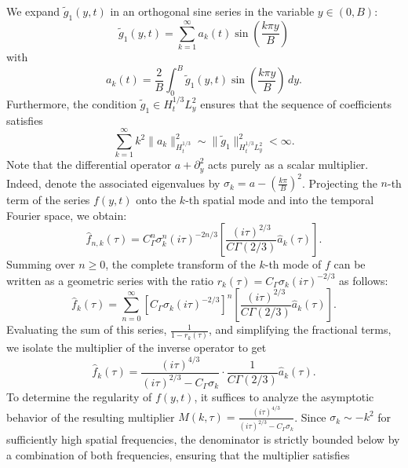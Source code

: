 \documentclass[11pt]{article}
\numberwithin{equation}{section}
\begin{document}
We expand $\tilde{g}_1(y,t)$ in an orthogonal sine series in the variable $y \in (0,B)$:
\begin{equation}
\tilde{g}_1(y,t) = \sum_{k=1}^{\infty} a_k(t) \sin\left(\frac{k\pi y}{B}\right)\end{equation}
with
\begin{equation}
a_k(t) = \frac{2}{B} \int_0^B \tilde{g}_1(y,t) \sin\left(\frac{k\pi y}{B}\right) \, dy.\end{equation}
Furthermore, the condition $\tilde{g}_1 \in H^{1/3}_t L^2_{y}$ ensures that the sequence of coefficients satisfies
\begin{equation}
\sum_{k=1}^{\infty} k^2 \|a_k\|_{H^{1/3}_{t}}^2 \sim \|\tilde{g}_1\|_{H^{1/3}_t L^2_y}^2 < \infty.
\end{equation}
Note that the differential operator $a+\partial^{2}_{y}$ acts purely as a scalar multiplier. Indeed, denote the associated eigenvalues by $\sigma_{k} = a - \left(\frac{k\pi}{B}\right)^2$. Projecting the $n$-th term of the series $f(y,t)$ onto the $k$-th spatial mode and into the temporal Fourier space, we obtain:
\begin{equation}\widehat{f}_{n,k}(\tau) = C_{\Gamma}^{n} \sigma_{k}^{n} (i\tau)^{-2n/3} \left[ \frac{(i\tau)^{2/3}}{C \Gamma(2/3)} \widehat{a}_{k}(\tau) \right].\end{equation}
Summing over $n \geq 0$, the complete transform of the $k$-th mode of $f$ can be written as a geometric series with the ratio $r_{k}(\tau) = C_{\Gamma} \sigma_{k} (i\tau)^{-2/3}$ as follows:
\begin{equation}
\widehat{f}_{k}(\tau) = \sum_{n=0}^{\infty} \left[ C_{\Gamma} \sigma_{k} (i\tau)^{-2/3} \right]^{n} \left[ \frac{(i\tau)^{2/3}}{C \Gamma(2/3)} \widehat{a}_{k}(\tau) \right].\end{equation}
Evaluating the sum of this series, $\frac{1}{1-r_k(\tau)}$, and simplifying the fractional terms, we isolate the multiplier of the inverse operator to get
\begin{equation}
\widehat{f}_{k}(\tau) = \frac{(i\tau)^{4/3}}{(i\tau)^{2/3} - C_{\Gamma} \sigma_{k}} \cdot \frac{1}{C \Gamma(2/3)} \widehat{a}_{k}(\tau).\end{equation}
To determine the regularity of $f(y,t)$, it suffices to analyze the asymptotic behavior of the resulting multiplier $M(k,\tau) = \frac{(i\tau)^{4/3}}{(i\tau)^{2/3} - C_{\Gamma} \sigma_{k}}$. Since $\sigma_{k} \sim -k^{2}$ for sufficiently high spatial frequencies, the denominator is strictly bounded below by a combination of both frequencies, ensuring that the multiplier satisfies
\end{document}
